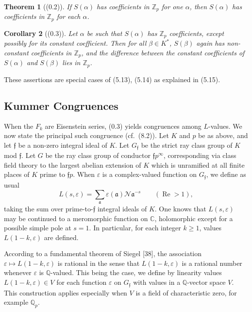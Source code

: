 \documentclass[12pt,a4paper]{article}
\theoremstyle{plain}
\newtheorem{theorem}{Theorem}[section]
\newtheorem{corollary}[theorem]{Corollary}
\theoremstyle{definition}
\DeclareMathOperator{\Res}{Re}
\newcommand{\ff}{\mathfrak{f}}
\newcommand{\Z}{\mathbb{Z}}
\newcommand{\Q}{\mathbb{Q}}
\newcommand{\C}{\mathbb{C}}
\begin{document}
\begin{theorem}[(0.2)]
If $S(\alpha)$ has coefficients in $\Z_p$ for one $\alpha$, then $S(\alpha)$ has coefficients in $\Z_p$ for each $\alpha$.
\end{theorem}

\begin{corollary}[(0.3)]
Let $\alpha$ be such that $S(\alpha)$ has $\Z_p$ coefficients, except possibly for its constant coefficient. Then for all $\beta\in K^*$, $S(\beta)$ again has non-constant coefficients in $\Z_p$, and the difference between the constant coefficients of $S(\alpha)$ and $S(\beta)$ lies in $\Z_p$.
\end{corollary}

These assertions are special cases of (5.13), (5.14) as explained in (5.15).

\subsection*{Kummer Congruences}

When the $F_k$ are Eisenstein series, (0.3) yields congruences among $L$-values. We now state the principal such congruence (cf.~(8.2)). Let $K$ and $p$ be as above, and let $\ff$ be a non-zero integral ideal of $K$. Let $G_{\ff}$ be the strict ray class group of $K$ mod $\ff$. Let $G$ be the ray class group of conductor $\ff p^{\infty}$, corresponding via class field theory to the largest abelian extension of $K$ which is unramified at all finite places of $K$ prime to $\ff p$. When $\varepsilon$ is a complex-valued function on $G_{\ff}$, we define as usual
\[
L(s,\varepsilon)=\sum_{\mathfrak{a}}\varepsilon(\mathfrak{a})\mathcal{N}\mathfrak{a}^{-s}\qquad(\Res>1),
\]
taking the sum over prime-to-$\ff$ integral ideals of $K$. One knows that $L(s,\varepsilon)$ may be continued to a meromorphic function on $\C$, holomorphic except for a possible simple pole at $s=1$. In particular, for each integer $k\ge1$, values $L(1-k,\varepsilon)$ are defined.

According to a fundamental theorem of Siegel [38], the association $\varepsilon\mapsto L(1-k,\varepsilon)$ is rational in the sense that $L(1-k,\varepsilon)$ is a rational number whenever $\varepsilon$ is $\Q$-valued. This being the case, we define by linearity values $L(1-k,\varepsilon)\in V$ for each function $\varepsilon$ on $G_{\ff}$ with values in a $\Q$-vector space $V$. This construction applies especially when $V$ is a field of characteristic zero, for example $\Q_p$.
\end{document}
